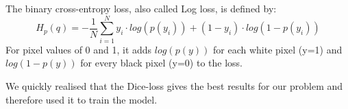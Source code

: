 The binary cross-entropy loss, also called Log loss, is defined by:
$$H_p (q) = -\frac{1}{N} \sum ^N _{i=1} y_i \cdot log(p(y_i))+(1-y_i) \cdot log(1-p(y_i))$$
For pixel values of 0 and 1, it adds $log(p(y))$ for each white pixel (y=1) and $log(1-p(y))$ for every black pixel (y=0) to the loss.

We quickly realised that the Dice-loss gives the best results for our problem and therefore used it to train the model. %

%

